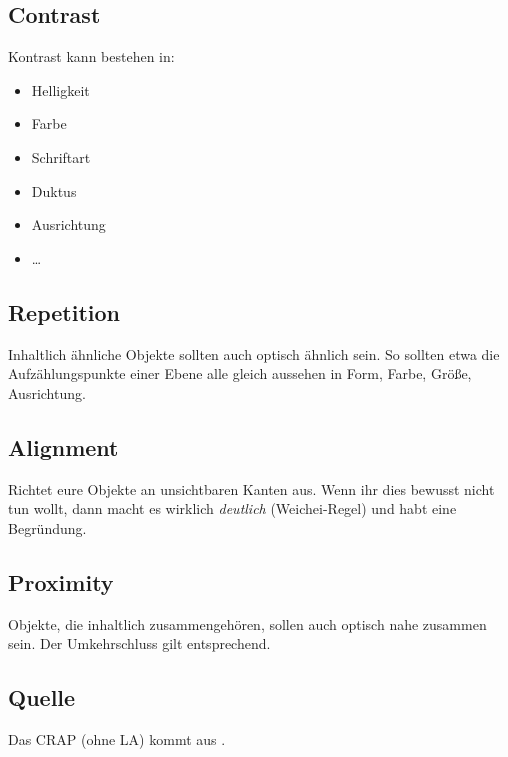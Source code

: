 \subsection{Contrast}
Kontrast kann bestehen in:
\begin{itemize}
    \item Helligkeit
    \item Farbe
    \item Schriftart
    \item Duktus
    \item Ausrichtung
    \item \ldots
\end{itemize}

\subsection{Repetition}
Inhaltlich ähnliche Objekte sollten auch optisch ähnlich sein. So sollten etwa die Aufzählungspunkte einer Ebene alle gleich aussehen in Form, Farbe, Größe, Ausrichtung.

\subsection{Alignment}
Richtet eure Objekte an unsichtbaren Kanten aus. Wenn ihr dies bewusst nicht tun wollt, dann macht es wirklich \emph{deutlich} (Weichei-Regel) und habt eine Begründung.

\subsection{Proximity}
Objekte, die inhaltlich zusammengehören, sollen auch optisch nahe zusammen sein. Der Umkehrschluss gilt entsprechend.

\subsection{Quelle}
Das CRAP (ohne LA) kommt aus \cite{non-designer}.
